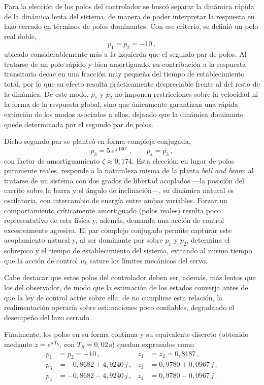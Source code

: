 Para la elección de los polos del controlador se buscó separar la dinámica rápida de la dinámica lenta del sistema, de manera de poder interpretar la respuesta en lazo cerrado en términos de polos dominantes. Con ese criterio, se definió un polo real doble,
\[
p_1 = p_2 = -10\,,
\]
ubicado considerablemente más a la izquierda que el segundo par de polos. Al tratarse de un polo rápido y bien amortiguado, su contribución a la respuesta transitoria decae en una fracción muy pequeña del tiempo de establecimiento total, por lo que su efecto resulta prácticamente despreciable frente al del resto de la dinámica. De este modo, $p_1$ y $p_2$ no imponen restricciones sobre la velocidad ni la forma de la respuesta global, sino que únicamente garantizan una rápida extinción de los modos asociados a ellos, dejando que la dinámica dominante quede determinada por el segundo par de polos.

Dicho segundo par se planteó en forma compleja conjugada,
\[
p_3 = 5\,e^{\,j\,100\text{°}}\,, \qquad p_4 = \overline{p_3}\,,
\]
con factor de amortiguamiento $\zeta \approx 0,174$. Esta elección, en lugar de polos puramente reales, responde a la naturaleza misma de la planta \textit{ball and beam}: al tratarse de un sistema con dos grados de libertad acoplados —la posición del carrito sobre la barra y el ángulo de inclinación—, su dinámica natural es oscilatoria, con intercambio de energía entre ambas variables. Forzar un comportamiento críticamente amortiguado (polos reales) resulta poco representativo de esta física y, además, demanda una acción de control excesivamente agresiva. El par complejo conjugado permite capturar este acoplamiento natural y, al ser dominante por sobre $p_1$ y $p_2$, determina el sobrepico y el tiempo de establecimiento del sistema, evitando al mismo tiempo que la acción de control $u_k$ sature los límites mecánicos del servo.

Cabe destacar que estos polos del controlador deben ser, además, más lentos que los del observador, de modo que la estimación de los estados converja antes de que la ley de control actúe sobre ella; de no cumplirse esta relación, la realimentación operaría sobre estimaciones poco confiables, degradando el desempeño del lazo cerrado.

Finalmente, los polos en su forma continua y su equivalente discreto (obtenido mediante $z = e^{s\,T_S}$, con $T_S = 0,02\,\text{s}$) quedan expresados como
\[
\begin{aligned}
p_1 &= p_2 = -10 \,, & z_1 &= z_2 = 0,8187\,, \\[4pt]
p_3 &= -0,8682 + 4,9240\,j\,, & z_3 &= 0,9780 + 0,0967\,j\,, \\[4pt]
p_4 &= -0,8682 - 4,9240\,j\,, & z_4 &= 0,9780 - 0,0967\,j\,.
\end{aligned}
\]

